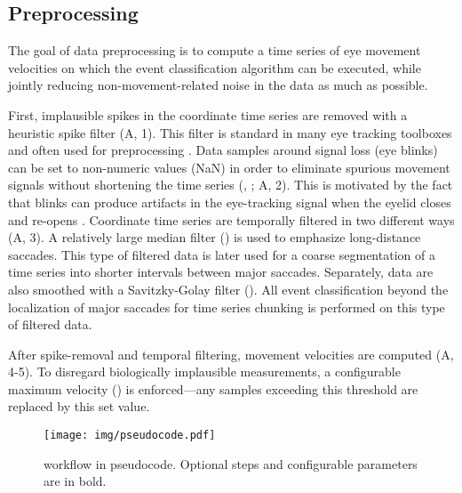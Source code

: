 \subsection*{Preprocessing}

The goal of data preprocessing is to compute a time series of eye movement
velocities on which the event classification algorithm can be executed, while jointly
reducing non-movement-related noise in the data as much as possible. 

First, implausible spikes in the coordinate time series are removed with a
heuristic spike filter \citep{stampe1993} (A, 1). This filter is
standard in many eye tracking toolboxes and often used for preprocessing
\citep[\eg][]{Nystrom2010AnData}.
%
Data samples around signal loss (\eg eye blinks) can be set to non-numeric values (NaN)
in order to eliminate spurious movement signals without shortening the time series
(, ; A, 2). This is
motivated by the fact that blinks can produce artifacts in the eye-tracking signal when the
eyelid closes and re-opens \citep{choe2016pupil}.
%
Coordinate time series are temporally filtered in two different ways
(A, 3). A relatively large median filter () is used to emphasize long-distance saccades.  This type of
filtered data is later used for a coarse segmentation of a time series into
shorter intervals between major saccades.
%
Separately, data are also smoothed with a Savitzky-Golay filter
(). All event classification beyond the
localization of major saccades for time series chunking is performed on this
type of filtered data.

After spike-removal and temporal filtering, movement velocities are computed
(A, 4-5). To disregard biologically implausible measurements, a
configurable maximum velocity () is enforced---any samples
exceeding this threshold are replaced by this set value.

%

\begin{figure*}
  \texttt{[image: img/pseudocode.pdf]}
  \caption{\remodnav workflow in pseudocode. Optional steps and configurable parameters are in bold.}
  \label{fig:alg}
\end{figure*}

